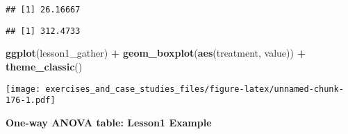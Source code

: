 \documentclass[]{book}
\newenvironment{Shaded}{\begin{snugshade}}{\end{snugshade}}
\newcommand{\DecValTok}[1]{\textcolor[rgb]{0.00,0.00,0.81}{#1}}
\newcommand{\KeywordTok}[1]{\textcolor[rgb]{0.13,0.29,0.53}{\textbf{#1}}}
\newcommand{\NormalTok}[1]{#1}
\newcommand{\OperatorTok}[1]{\textcolor[rgb]{0.81,0.36,0.00}{\textbf{#1}}}
\newcommand{\StringTok}[1]{\textcolor[rgb]{0.31,0.60,0.02}{#1}}
\theoremstyle{definition}
\theoremstyle{definition}
\theoremstyle{definition}
\theoremstyle{remark}
\begin{document}
\begin{Shaded}
\end{Shaded}

\begin{verbatim}
## [1] 26.16667
\end{verbatim}

\begin{Shaded}
\end{Shaded}

\begin{verbatim}
## [1] 312.4733
\end{verbatim}

\begin{Shaded}
\begin{Highlighting}[]
\KeywordTok{ggplot}\NormalTok{(lesson1_gather) }\OperatorTok{+}
\StringTok{  }\KeywordTok{geom_boxplot}\NormalTok{(}\KeywordTok{aes}\NormalTok{(treatment, value)) }\OperatorTok{+}
\StringTok{  }\KeywordTok{theme_classic}\NormalTok{()}
\end{Highlighting}
\end{Shaded}

\texttt{[image: exercises\_and\_case\_studies\_files/figure-latex/unnamed-chunk-176-1.pdf]}

\textbf{One-way ANOVA table: Lesson1 Example}
\end{document}
